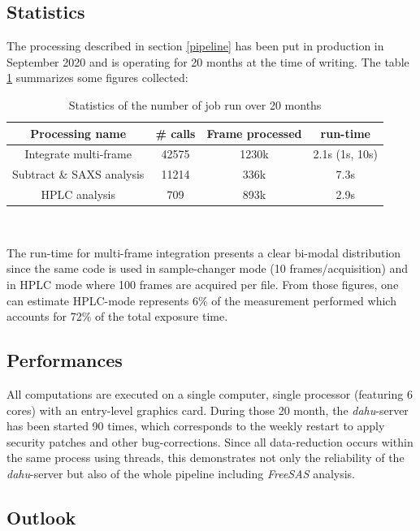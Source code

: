 \documentclass[preprint]{iucr}              %
\begin{document}
\subsection{Statistics}
The processing described in section \ref{pipeline} has been put in production in September 2020 and is operating for 20 months at the time of writing.
The table \ref{stats} summarizes some figures collected:
\begin{table}
    \begin{tabular}{|c|c|c|c|}
        \hline
        Processing name & # calls & Frame processed & run-time \\
        \hline
        Integrate multi-frame & 42575 & 1230k & 2.1s (1s, 10s) \\
        Subtract \& SAXS analysis & 11214 & 336k & 7.3s \\
        HPLC analysis & 709 & 893k & 2.9s \\
        \hline
    \end{tabular}
    \\
    \caption{Statistics of the number of job run over 20 months}
    \label{stats}
\end{table}

The run-time for multi-frame integration presents a clear bi-modal distribution since the same code is used in sample-changer mode (10 frames/acquisition) and in HPLC mode where 100 frames are acquired per file.
From those figures, one can estimate HPLC-mode represents 6\% of the measurement performed which accounts for 72\% of the total exposure time.

\subsection{Performances}

All computations are executed on a single computer, single processor (featuring 6 cores) with an entry-level graphics card. 
During those 20 month, the \textit{dahu}-server has been started 90 times, which corresponds to the weekly restart to apply security patches and other bug-corrections. 
Since all data-reduction occurs within the same process using threads, this demonstrates not only the reliability of the \textit{dahu}-server 
but also of the whole pipeline including \textit{FreeSAS} analysis.
\subsection{Outlook}
\end{document}
